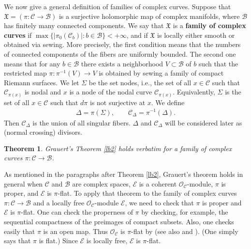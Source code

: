 \documentclass[12pt,a4paper,notitlepage]{report}
\theoremstyle{definition}
\theoremstyle{plain}
\newtheorem{thm}[df]{Theorem}
\newcommand{\fk}{\mathfrak}
\newcommand{\mc}{\mathcal}
\newcommand{\scr}{\mathscr}
\numberwithin{equation}{section}
\begin{document}
We now give a general definition of families of complex curves.   Suppose that $\fk X=(\pi:\mc C\rightarrow \mc B)$ is a surjective holomorphic map of  complex manifolds, where $\mc B$ has finitely many connected components. We say that $\fk X$ is a \textbf{family of complex curves} if $\max\{|\pi_0(\mc C_b)|:b\in\mc B\}<+\infty$, and if $\fk X$  is locally either smooth or obtained via sewing.  More precisely, the first condition means that the numbers of connected components of the fibers are uniformly bounded. The second one  means that for any $b\in\mc B$ there exists a neighborhood $V\subset\mc B$ of $b$ such that the restricted map $\pi:\pi^{-1}(V)\rightarrow V$ is obtained by sewing a family of compact Riemann surfaces. We let $\Sigma$ be the set nodes, i.e., the set of all $x\in\mc C$ such that $\mc C_{\pi(x)}$ is nodal and $x$ is a node of the nodal curve $\mc C_{\pi(x)}$.  Equivalently, $\Sigma$ is the set of all $x\in\mc C$ such that $d\pi$ is not surjective at $x$. We  \index{CDelta@$\mc C_\Delta=\pi^{-1}(\Delta)$}  define
\begin{align*}
\Delta=\pi(\Sigma),\qquad \mc C_\Delta=\pi^{-1}(\Delta).
\end{align*}
Then $\mc C_\Delta$ is the union of all singular fibers. $\Delta$ and $\mc C_\Delta$ will be considered later as (normal crossing) divisors. 

\begin{thm}\label{lb11}
Grauert's Theorem \ref{lb2} holds verbatim for a family of complex curves $\pi:\mc C\rightarrow\mc B$.
\end{thm}


As mentioned in  the paragraphs after Theorem \ref{lb2}, Grauert's theorem holds in general when $\mc C$ and $\mc B$ are complex spaces, $\scr E$ is a coherent $\scr O_{\mc C}$-module, $\pi$ is proper, and $\scr E$ is $\pi$-flat. To apply that theorem to  the family of complex curves $\pi:\mc C\rightarrow\mc B$ and a locally free $\scr O_{\mc C}$-module $\scr E$, we need to check  that $\pi$ is proper and $\scr E$ is $\pi$-flat. One can check the properness of $\pi$ by checking, for example, the sequential compactness of the preimages of  compact subsets. Also, one checks easily that $\pi$ is an open map. Thus $\scr O_{\mc C}$ is $\pi$-flat by  \cite[Sec. 3.20]{Fis76} (see also \cite[Thm. II.2.13]{GPR94} and \cite[Thm. V.2.13]{BS76}). (One simply says that $\pi$ is flat.) Since $\scr E$ is locally free, $\scr E$ is $\pi$-flat.
\end{document}
